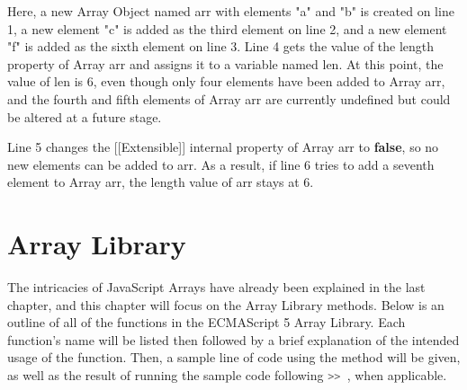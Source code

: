 \documentclass[a4paper,11pt,twoside]{report}
\def\jsinline{\lstinline[language=JavaScript, basicstyle=\small]}%\end{lstlisting}
\begin{document}
Here, a new Array Object named arr with elements "a" and "b" is created on line 1, a new element "c" is added as the third element on line 2, and a new element "f" is added as the sixth element on line 3. Line 4 gets the value of the length property of Array arr and assigns it to a variable named len. At this point, the value of len is 6, even though only four elements have been added to Array arr, and the fourth and fifth elements of Array arr are currently undefined but could be altered at a future stage.

Line 5 changes the [[Extensible]] internal property of Array arr to \textbf{false}, so no new elements can be added to arr. As a result, if line 6 tries to add a seventh element to Array arr, the length value of arr stays at 6.

\section{Array Library}
The intricacies of JavaScript Arrays have already been explained in the last chapter, and this chapter will focus on the Array Library methods. Below is an outline of all of the functions in the ECMAScript 5 Array Library. Each function's name will be listed then followed by a brief explanation of the intended usage of the function. Then, a sample line of code using the method will be given, as well as the result of running the sample code following \jsinline|>> |, when applicable.
\end{document}
